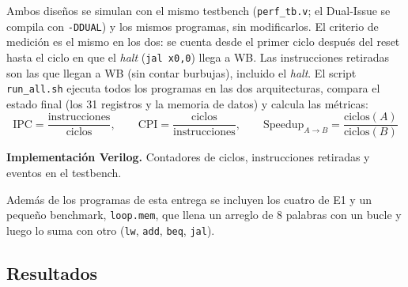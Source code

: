 \documentclass[12pt,a4paper]{article}
\begin{document}
Ambos diseños se simulan con el mismo testbench (\texttt{perf\_tb.v}; el Dual-Issue se compila con \texttt{-DDUAL}) y los mismos programas, sin modificarlos. El criterio de medición es el mismo en los dos: se cuenta desde el primer ciclo después del reset hasta el ciclo en que el \textit{halt} (\texttt{jal x0,0}) llega a WB. Las instrucciones retiradas son las que llegan a WB (sin contar burbujas), incluido el \textit{halt}. El script \texttt{run\_all.sh} ejecuta todos los programas en las dos arquitecturas, compara el estado final (los 31 registros y la memoria de datos) y calcula las métricas:
\begin{equation*}
\text{IPC} = \frac{\text{instrucciones}}{\text{ciclos}}, \qquad
\text{CPI} = \frac{\text{ciclos}}{\text{instrucciones}}, \qquad
\text{Speedup}_{A\to B} = \frac{\text{ciclos}(A)}{\text{ciclos}(B)}
\end{equation*}


\begin{samepage}
\noindent\textbf{Implementación Verilog.} Contadores de ciclos, instrucciones retiradas y eventos en el testbench.
\end{samepage}


Además de los programas de esta entrega se incluyen los cuatro de E1 y un pequeño benchmark, \texttt{loop.mem}, que llena un arreglo de 8 palabras con un bucle y luego lo suma con otro (\texttt{lw}, \texttt{add}, \texttt{beq}, \texttt{jal}).

\subsection{Resultados}
\end{document}
